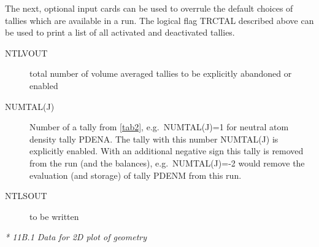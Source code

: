 The next, optional input cards can be used to overrule the default choices of
tallies which are available in a run.
The logical flag TRCTAL described above can be used to print a list of all
activated and deactivated tallies.
\begin{description}
  \item[NTLVOUT] total number of volume averaged tallies to be explicitly
        abandoned or enabled
  \item[NUMTAL(J)] Number of a tally from \cref{tab2}, e.g.\
        NUMTAL(J)=1 for neutral atom density tally PDENA.
        The tally with this number NUMTAL(J) is explicitly enabled.
        With an additional negative sign this tally is removed from the run (and the
        balances), e.g.\ NUMTAL(J)=-2 would remove the evaluation (and storage) of
        tally PDENM from this run.
  \item[NTLSOUT] to be written
\end{description}

\textsl{* 11B.1 Data for 2D plot of geometry}

